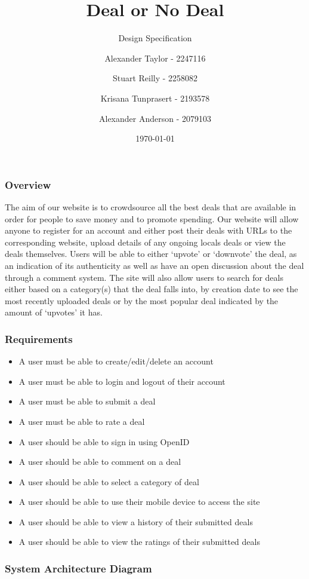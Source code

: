 \documentclass{beamer}
\title{Deal or No Deal}
\subtitle{Design Specification}
\author{Alexander Taylor - 2247116 \and Stuart Reilly - 2258082 \and Krisana Tunprasert - 2193578\and Alexander Anderson - 2079103}
\date{\today}
\begin{document}
\frame{\titlepage}

\begin{frame}
	\frametitle{Overview}
	The aim of our website is to crowdsource all the best deals that are available in order for people to save money and to promote spending. Our website will allow anyone to register for an account and either post their deals with URLs to the corresponding website, upload details of any ongoing locals deals or view the deals themselves. Users will be able to either ‘upvote’ or ‘downvote’ the deal, as an indication of its authenticity as well as have an open discussion about the deal through a comment system. The site will also allow users to search for deals either based on a category(s) that the deal falls into, by creation date to see the most recently uploaded deals or by the most popular deal indicated by the amount of ‘upvotes’ it has.
\end{frame}

\begin{frame}
	\frametitle{Requirements}
	\begin{itemize}
		\item A user must be able to create/edit/delete an account
		\item A user must be able to login and logout of their account
		\item A user must be able to submit a deal
		\item A user must be able to rate a deal
		\item A user should be able to sign in using OpenID
		\item A user should be able to comment on a deal
		\item A user should be able to select a category of deal
		\item A user should be able to use their mobile device to access the site
		\item A user should be able to view a history of their submitted deals
		\item A user should be able to view the ratings of their submitted deals
	\end{itemize}
\end{frame}

\begin{frame}
	\frametitle{System Architecture Diagram}
	\resizebox{\textwidth}{!}{}
\end{frame}
\end{document}
